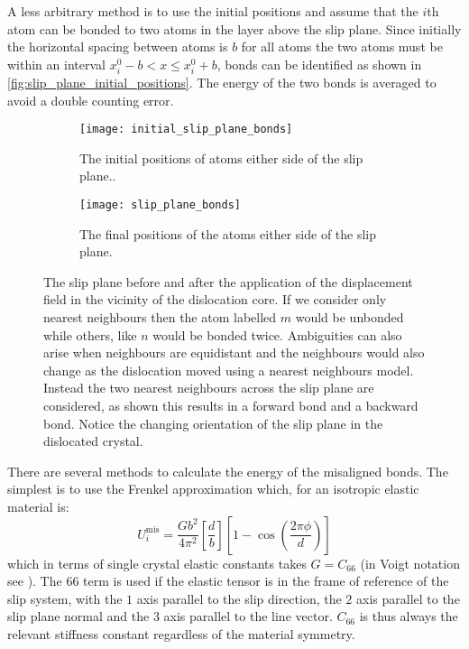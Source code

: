 A less arbitrary method is to use the initial positions and assume that the $i$th atom can be bonded to two atoms in the layer above the slip plane. Since initially the horizontal spacing between atoms is $b$ for all atoms the two atoms must be within an interval $x_i^0 - b < x \leq x_i^0 + b$, bonds can be identified as shown in \autoref{fig:slip_plane_initial_positions}. The energy of the two bonds is averaged to avoid a double counting error.

\begin{figure}
\centering
\begin{subfigure}{\textwidth}
\centering
\texttt{[image: initial\_slip\_plane\_bonds]}
\caption{The initial positions of atoms either side of the slip plane.\label{fig:slip_plane_initial_positions}.}
\end{subfigure}
\par\medskip
\begin{subfigure}{\textwidth}
\texttt{[image: slip\_plane\_bonds]}
\caption{The final positions of the atoms either side of the slip plane.\label{fig:slip_plane_final_positions}}
\end{subfigure}
\caption[Misaligned bonds across the slip plane.]{The slip plane before and after the application of the displacement field in the vicinity of the dislocation core. If we consider only nearest neighbours then the atom labelled $m$ would be unbonded while others, like $n$ would be bonded twice. Ambiguities can also arise when neighbours are equidistant and the neighbours would also change as the dislocation moved using a nearest neighbours model. Instead the two nearest neighbours across the slip plane are considered, as shown this results in a forward bond and a backward bond. Notice the changing orientation of the slip plane in the dislocated crystal.\label{fig:slip_plane}}
\end{figure}


There are several methods to calculate the energy of the misaligned bonds. The simplest is to use the Frenkel approximation which, for an isotropic elastic material is:
\begin{equation}
U_i^\text{mis} = \frac{Gb^2}{4\pi^2} \left[\frac{d}{b}\right] \left[ 1 - \cos \left( \frac{2 \pi \phi}{d} \right) \right]
\end{equation}
which in terms of single crystal elastic constants takes $G=C_{66}$ (in Voigt notation see \cite{kelly_knowles2012chapter6_stress_strain}). The $66$ term is used if the elastic tensor is in the frame of reference of  the slip system, with the $1$ axis parallel to the slip direction, the $2$ axis parallel to the slip plane normal and the $3$ axis parallel to the line vector. $C_{66}$ is thus always the relevant stiffness constant regardless of the material symmetry.

